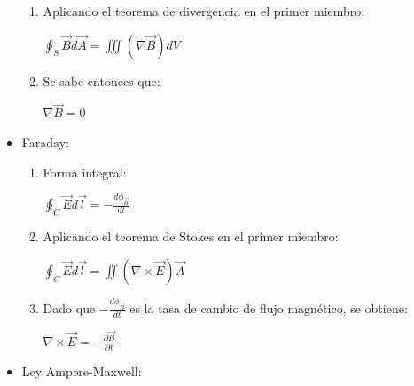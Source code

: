 \documentclass[a4paper]{article}
\begin{document}
\begin{multicols}{2}
\begin{itemize}
\begin{enumerate}
                                \item Aplicando el teorema de divergencia en el primer miembro:
                                    \begin{center} $\oint_S \vec{B} d\vec{A} = \iiint (\nabla \vec{B})dV$ \end{center}
                                \item Se sabe entonces que:
                                    \begin{center} $\nabla \vec{B} = 0$ \end{center}
                            \end{enumerate}
                        \item Faraday:
                            \begin{enumerate}
                                \item Forma integral:
                                    \begin{center} $\oint_C \vec{E} d\vec{l} = - \frac{d\phi_{\vec{B}}}{dt}$ \end{center}
                                \item Aplicando el teorema de Stokes en el primer miembro:
                                    \begin{center} $\oint_C \vec{E} d\vec{l} = \iint (\nabla \times \vec{E}) \vec{A}$ \end{center}
                                \item Dado que $- \frac{d\phi_{\vec{B}}}{dt}$ es la tasa de cambio de flujo magnético, se obtiene:
                                    \begin{center} $\nabla \times \vec{E} = -\frac{\partial \vec{B}}{\partial t}$ \end{center}
                            \end{enumerate}
                        \item Ley Ampere-Maxwell:
                            \begin{enumerate}
                                \
                            \end{enumerate}
                    \end{itemize}
\end{multicols}
\end{document}

